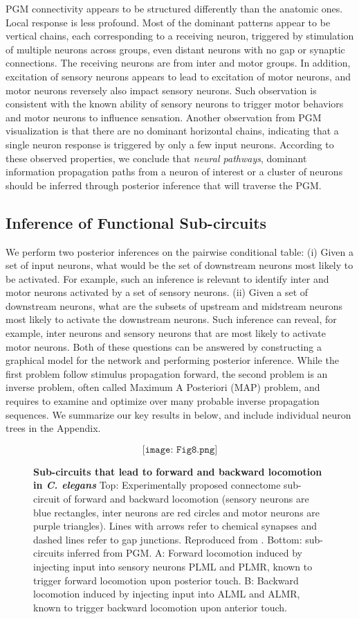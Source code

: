 \documentclass[letterpaper,11pt]{article}
\newcommand\tab[1][6mm]{\hspace*{#1}}
\begin{document}
PGM connectivity appears to be structured differently than the anatomic ones. Local response is less profound. Most of the dominant patterns appear to be vertical chains, each corresponding to a receiving neuron, triggered by stimulation of multiple neurons across groups, even distant neurons with no gap or synaptic connections. The receiving neurons are from inter and motor groups. In addition, excitation of sensory neurons appears to lead to excitation of motor neurons, and motor neurons reversely also impact sensory neurons. Such observation is consistent with the known ability of sensory neurons to trigger motor behaviors and motor neurons to influence sensation. Another observation from PGM visualization is that there are no dominant horizontal chains, indicating that a single neuron response is triggered by only a few input neurons. According to these observed
properties, we conclude that \textit{neural pathways}, dominant information propagation paths from a neuron of interest or a cluster of neurons should be inferred through posterior inference that will traverse the PGM. 

\subsection{Inference of Functional Sub-circuits}
\tab We perform two posterior inferences on the pairwise conditional table: (i) Given a set of input neurons, what would be the set of downstream neurons most likely to be activated. For example, such an inference is relevant to identify inter and motor neurons activated by a set of sensory neurons. (ii) Given a set of downstream neurons, what are the subsets of upstream and midstream neurons most likely to activate the downstream neurons. Such inference can reveal, for example, inter neurons and sensory neurons that are most likely to activate motor neurons. Both of these questions can be answered by constructing a graphical model for the network and performing posterior inference. While the first problem follow stimulus propagation forward, the second problem is an inverse problem, often called Maximum A Posteriori (MAP) problem, and requires to examine and optimize over many probable inverse propagation sequences. We summarize our key results in below, and include individual neuron trees in the Appendix.

\begin{figure}[t!]
  \[\texttt{[image: Fig8.png]}\]
  \caption{\textbf{Sub-circuits that lead to forward and backward locomotion in \textit{C. elegans}} Top: Experimentally proposed connectome sub-circuit of forward and backward locomotion (sensory neurons are blue rectangles, inter neurons are red circles and motor neurons are purple triangles). Lines with arrows refer to chemical synapses and dashed lines refer to gap junctions. Reproduced from \cite{dynamic1}. Bottom: sub-circuits inferred from PGM. A:  Forward locomotion induced by injecting input into sensory neurons PLML and PLMR, known to trigger forward locomotion upon posterior touch. B: Backward locomotion induced by injecting input into ALML and ALMR, known to trigger backward locomotion upon anterior touch.}\label{fig:fwdbwdloc}
\end{figure}
\end{document}
